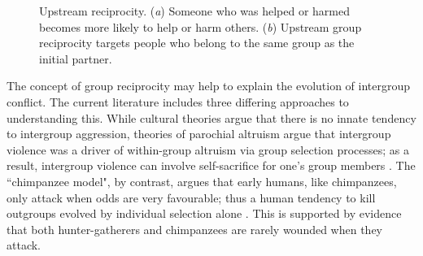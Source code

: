\documentclass[12pt,a4paper]{article}\usepackage[]{graphicx}\usepackage[]{color}
\begin{document}
\begin{figure}
\begin{center}
\begin{subfigure}[b]{0.4\textwidth}
            \caption{}\label{group}
        \end{subfigure}
        \caption{Upstream reciprocity. (\textit{a}) Someone who was helped or harmed becomes more likely to help or harm others. (\textit{b})
    Upstream group reciprocity targets people who belong to
    the same group as the initial partner.}
        \label{fig:illustration}
	\end{center}
\end{figure}

The concept of group reciprocity may help to explain the evolution of intergroup conflict. The current literature
includes three differing approaches to understanding this. While cultural theories argue that there is no innate tendency to
intergroup aggression, theories of parochial altruism argue that intergroup violence was a driver of within-group
altruism via group selection processes; as a result, intergroup violence can involve self-sacrifice for one's group
members \citep{choi2007coevolution,bowles2009did}. The ``chimpanzee model", by contrast, argues that early humans, like
chimpanzees, only attack when odds are very favourable; thus a human tendency to kill outgroups evolved by individual
selection alone \citep{wrangham2012intergroup}. This is supported by evidence that both
hunter-gatherers and chimpanzees are rarely wounded when they attack.
\end{document}
